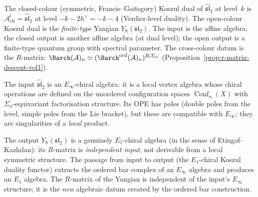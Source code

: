 \begin{remark}
\label{rem:closed-vs-open-sl2}
The closed-colour (symmetric, Francis--Gaitsgory) Koszul dual of
$\widehat{\mathfrak{sl}}_2$ at level~$k$ is
$\mathcal A^!_{\mathrm{ch}}=\widehat{\mathfrak{sl}}_2$ at level
$-k-2h^\vee=-k-4$ (Verdier-level duality). The open-colour
Koszul dual is the \emph{finite-type} Yangian $Y_\hbar(\mathfrak{sl}_2)$.
The input is the affine algebra; the closed output is another
affine algebra (at dual level); the open output is a finite-type
quantum group with spectral parameter. The cross-colour datum is the
$R$-matrix: $\Barch(\mathcal A)_n\simeq
({\Barch}^{\mathrm{ord}}(\mathcal A)_n)^{R\text{-}\Sigma_n}$
(Proposition~\ref{prop:r-matrix-descent-vol1}).
\end{remark}

\begin{remark}
\label{rem:e-inf-e1-sl2}
The input $\widehat{\mathfrak{sl}}_2$ is an $E_\infty$-chiral algebra:
it is a local vertex algebra whose chiral operations are defined on
the unordered configuration spaces $\operatorname{Conf}_n(X)$ with
$\Sigma_n$-equivariant factorisation structure. Its OPE has poles
(double poles from the level, simple poles from the Lie bracket), but
these are compatible with $E_\infty$; they are singularities of a
\emph{local} product.

The output $Y_\hbar(\mathfrak{sl}_2)$ is a genuinely $E_1$-chiral
algebra (in the sense of Etingof--Kazhdan): its $R$-matrix is
\emph{independent input}, not derivable from a local symmetric
structure. The passage from input to output (the
$E_1$-chiral Koszul duality functor) extracts the ordered bar
complex of an $E_\infty$ algebra and produces an $E_1$ algebra.
The $R$-matrix of the Yangian is independent of the input's
$E_\infty$ structure; it is the \emph{new} algebraic datum created by
the ordered bar construction.
\end{remark}


